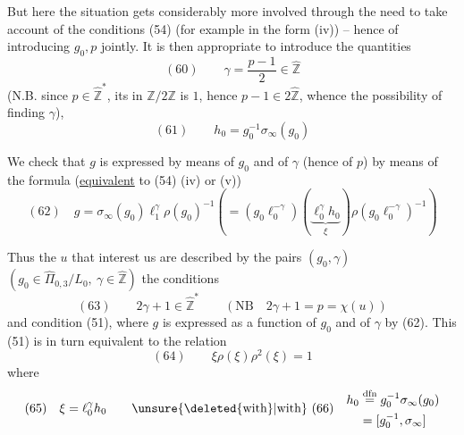 
But here the situation gets considerably more involved through the need to take account of the  conditions (54) (for example in the form (iv)) -- hence  of introducing $g_0,p$ jointly. It is then appropriate to introduce the quantities
\[
(60)\qquad \gamma=\frac{p-1}{2}\in\widehat{\mathbb Z}
\]
(N.B. since $p\in\widehat{\mathbb Z}^{\ast}$, its  in $\mathbb Z/2\mathbb Z$ is $1$, hence $p-1\in2\widehat{\mathbb Z}$, whence the possibility of finding $\gamma$),
\[
(61)\qquad h_0=g_0^{-1}\sigma_\infty(g_0)
\]


 We check  that $g$ is expressed by means of $g_0$ and of $\gamma$ (hence of $p$) by means of the formula (\uline{equivalent} to (54) (iv) or (v))
\[
(62)\quad
\boxed{g=\sigma_\infty(g_0)\ell_1^\gamma\rho(g_0)^{-1}}
\left(=(g_0\ell_0^{-\gamma})\left(\underbrace{\ell_0^\gamma h_0}_{\xi}\right)\rho(g_0\ell_0^{-\gamma})^{-1}\right)
\]


Thus the $u$ that interest us are described by the pairs $(g_0,\gamma)$ $(g_0\in\widehat{\Pi}_{0,3}/L_0,\ \gamma\in\widehat{\mathbb Z})$  the conditions
\[
(63)\qquad 2\gamma+1\in\widehat{\mathbb Z}^{\ast}\qquad (\mathrm{NB}\quad 2\gamma+1=p=\chi(u))
\]
and condition (51), where $g$ is expressed as a function of $g_0$ and of $\gamma$ by (62). This  (51) is in turn equivalent to the relation
\[
(64)\qquad\boxed{\xi\rho(\xi)\rho^2(\xi)=1}
\]
where
\[
(65)\quad\xi=\ell_0^\gamma h_0
\qquad\unsure{\deleted{\text{with}}|\text{with}}\ (66)\quad
\begin{aligned}
h_0&\overset{\mathrm{dfn}}{=}
g_0^{-1}\sigma_\infty(g_0)\\
&{}=[g_0^{-1},\sigma_\infty]
\end{aligned}
\]


